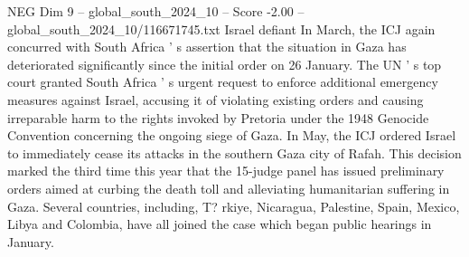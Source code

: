\begin{textsample}{NEG Dim 9 – global\_south\_2024\_10 – Score -2.00 – global\_south\_2024\_10/116671745.txt}
Israel defiant In March, the ICJ again concurred with South Africa ' s assertion that the situation in Gaza has deteriorated significantly since the initial order on 26 January.
The UN ' s top court granted South Africa ' s urgent request to enforce additional emergency measures against Israel, accusing it of violating existing orders and causing irreparable harm to the rights invoked by Pretoria under the 1948 Genocide Convention concerning the ongoing siege of Gaza.
In May, the ICJ ordered Israel to immediately cease its attacks in the southern Gaza city of Rafah.
This decision marked the third time this year that the 15-judge panel has issued preliminary orders aimed at curbing the death toll and alleviating humanitarian suffering in Gaza.
Several countries, including, T? rkiye, Nicaragua, Palestine, Spain, Mexico, Libya and Colombia, have all joined the case which began public hearings in January.

\end{textsample}
